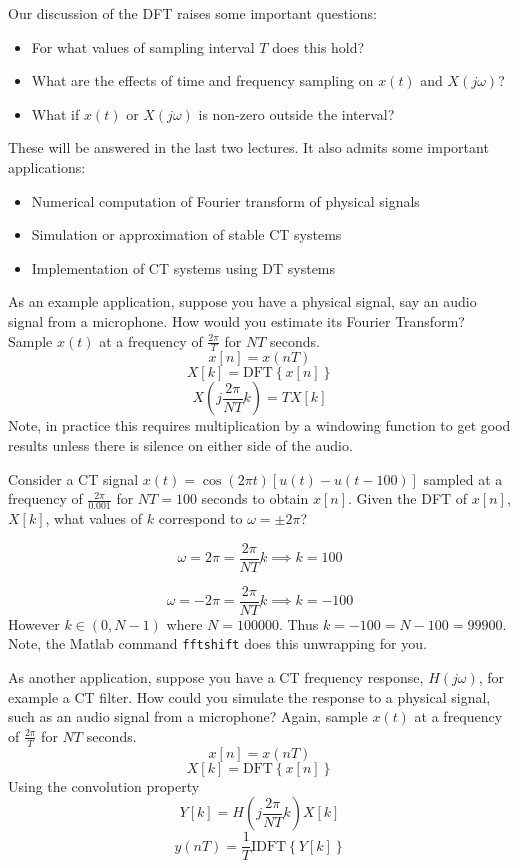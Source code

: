 Our discussion of the DFT raises some important questions:

\begin{itemize}
\item For what values of sampling interval $T$ does this hold?
\item What are the effects of time and frequency sampling on $x(t)$ and $X(j\omega)$?
\item What if $x(t)$ or $X(j\omega)$ is non-zero outside the interval?
\end{itemize}
These will be answered in the last two lectures. It also admits some important applications:
\begin{itemize}
\item Numerical computation of Fourier transform of physical signals
\item Simulation or approximation of stable CT systems
\item Implementation of CT systems using DT systems
\end{itemize}

As an example application, suppose you have a physical signal, say an audio signal from a microphone. How would you estimate its Fourier Transform? Sample $x(t)$ at a frequency of $\frac{2\pi}{T}$ for $NT$ seconds.
\[
x[n] = x(nT)
\]
\[
X[k] = \text{DFT}\left\{ x[n] \right\}
\]
\[
X\left(j\frac{2\pi}{NT} k\right) = T X[k]
\]
Note, in practice this requires multiplication by a windowing function to get good results unless there is silence on either side of the audio.

\begin{example}
  Consider a CT signal $x(t) = \cos(2\pi t)\left[u(t) - u(t-100)\right]$ sampled at a frequency of $\frac{2\pi}{0.001}$ for $NT = 100$ seconds to obtain $x[n]$. Given the DFT of $x[n]$, $X[k]$, what values of $k$ correspond to $\omega = \pm 2\pi$?
  
  \[
  \omega = 2\pi = \frac{2\pi}{NT} k \implies k = 100
  \]
  
  \[
  \omega = - 2\pi = \frac{2\pi}{NT} k \implies k = -100
  \]
  However $k \in (0, N-1)$ where $N= 100000$. Thus $k = -100 = N - 100 = 99900$. Note, the Matlab command \texttt{fftshift} does this unwrapping for you.
\end{example}

As another application, suppose you have a CT frequency response, $H(j\omega)$, for example a CT filter. How could you simulate the response to a physical signal, such as an audio signal from a microphone? Again, sample $x(t)$ at a frequency of $\frac{2\pi}{T}$ for $NT$ seconds.
\[
x[n] = x(nT)
\]
\[
X[k] = \text{DFT}\left\{ x[n] \right\}
\]
Using the convolution property
\[
Y[k] = H\left(j\frac{2\pi}{NT} k\right) X[k]
\]
\[
y(nT) = \frac{1}{T} \text{IDFT}\left\{ Y[k] \right\}
\]

